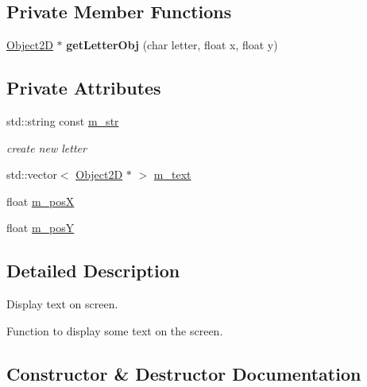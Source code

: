 \subsection*{Private Member Functions}
\begin{DoxyCompactItemize}
\item 
\hypertarget{class_generate_text_a0284aa0197083b5b7c035e890f2d4ee6}{}\hyperlink{class_object2_d}{Object2\+D} $\ast$ {\bfseries get\+Letter\+Obj} (char letter, float x, float y)\label{class_generate_text_a0284aa0197083b5b7c035e890f2d4ee6}

\end{DoxyCompactItemize}
\subsection*{Private Attributes}
\begin{DoxyCompactItemize}
\item 
std\+::string const \hyperlink{class_generate_text_af19fb4b037211d026f4344a88174c555}{m\+\_\+str}
\begin{DoxyCompactList}\small\item\em create new letter \end{DoxyCompactList}\item 
std\+::vector$<$ \hyperlink{class_object2_d}{Object2\+D} $\ast$ $>$ \hyperlink{class_generate_text_adc0479fef3c53816e44371416ffc467a}{m\+\_\+text}
\item 
float \hyperlink{class_generate_text_a8cb1c4cb430700466a123306afce1530}{m\+\_\+pos\+X}
\item 
float \hyperlink{class_generate_text_a5696c6548e6448b14fa4442df90d6de3}{m\+\_\+pos\+Y}
\end{DoxyCompactItemize}


\subsection{Detailed Description}
Display text on screen. 

Function to display some text on the screen. 

\subsection{Constructor \& Destructor Documentation}
\hypertarget{class_generate_text_a7ebb2297410b61c7dd02755087d268b4}{}
